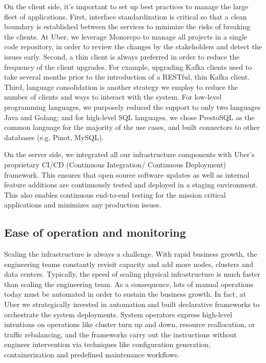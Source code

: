\documentclass[sigconf]{acmart}
\begin{document}
On the client side, it’s important to set up best practices to manage the large fleet of applications. First, interface standardization is critical so that a clean boundary is established between the services to minimize the risks of breaking the clients. At Uber, we leverage Monorepo\cite{monorepo} to manage all projects in a single code repository, in order to review the changes by the stakeholders and detect the issues early. Second, a thin client is always preferred in order to reduce the frequency of the client upgrades. For example, upgrading Kafka clients used to take several months prior to the introduction of a RESTful, thin Kafka client. Third, language consolidation is another strategy we employ to reduce the number of clients and ways to interact with the system. For low-level programming languages, we purposely reduced the support to only two languages Java and Golang; and for high-level SQL languages, we chose PrestoSQL as the common language for the majority of the use cases, and built connectors to other databases (e.g. Pinot, MySQL).

On the server side, we integrated all our infrastructure components with Uber’s proprietary CI/CD (Continuous Integration/ Continuous Deployment) framework. This ensures that open source software updates as well as internal feature additions are continuously tested and deployed in a staging environment. This also enables continuous end-to-end testing for the mission critical applications and minimizes any production issues. 

\subsection{Ease of operation and monitoring}

Scaling the infrastructure is always a challenge. With rapid business growth, the engineering teams constantly revisit capacity and add more nodes, clusters and data centers. Typically, the speed of scaling physical infrastructure is much faster than scaling the engineering team. As a consequence, lots of manual operations today must be automated in order to sustain the business growth. In fact, at Uber we strategically invested in automation and built declarative frameworks to orchestrate the system deployments. System operators express high-level intentions on operations like cluster turn up and down, resource reallocation, or traffic rebalancing, and the frameworks carry out the instructions without engineer intervention via techniques like configuration generation, containerization and predefined maintenance workflows.
\end{document}
